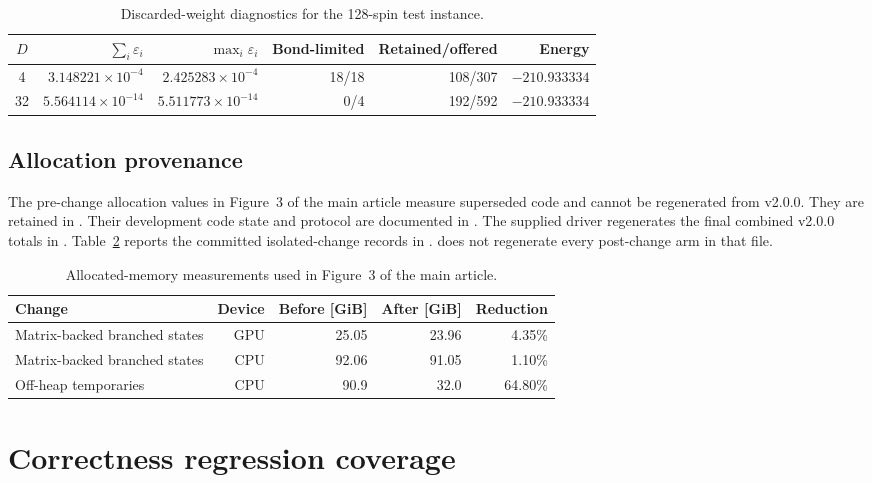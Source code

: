 \begin{table}[htbp]
\scriptsize
\centering
\caption{Discarded-weight diagnostics for the 128-spin test instance.}
\label{tab:supp-eps}
\begin{tabular}{@{}crrrrr@{}}
\toprule
$D$ & $\sum_i\varepsilon_i$ & $\max_i\varepsilon_i$ &
Bond-limited & Retained/offered & Energy \\
\midrule
4  & $3.148221\times10^{-4}$ & $2.425283\times10^{-4}$ &
18/18 & 108/307 & $-210.933334$ \\
32 & $5.564114\times10^{-14}$ & $5.511773\times10^{-14}$ &
0/4 & 192/592 & $-210.933334$ \\
\bottomrule
\end{tabular}
\end{table}

\subsection{Allocation provenance}

The pre-change allocation values in Figure~3 of the main article measure
superseded code and cannot be regenerated from v2.0.0. They are retained in
. Their development code state and protocol are documented
in . The supplied driver regenerates the final combined
v2.0.0 totals in .
Table~\ref{tab:supp-allocation} reports the committed isolated-change records in
.  does not regenerate every
post-change arm in that file.

\begin{table}[htbp]
\small
\centering
\caption{Allocated-memory measurements used in Figure~3 of the main article.}
\label{tab:supp-allocation}
\begin{tabular}{@{}lrrrr@{}}
\toprule
Change & Device & Before [GiB] & After [GiB] & Reduction \\
\midrule
Matrix-backed branched states & GPU & 25.05 & 23.96 & 4.35\% \\
Matrix-backed branched states & CPU & 92.06 & 91.05 & 1.10\% \\
Off-heap temporaries & CPU & 90.9 & 32.0 & 64.80\% \\
\bottomrule
\end{tabular}
\end{table}
\FloatBarrier

\section{Correctness regression coverage}
\label{sec:supp-correctness}

